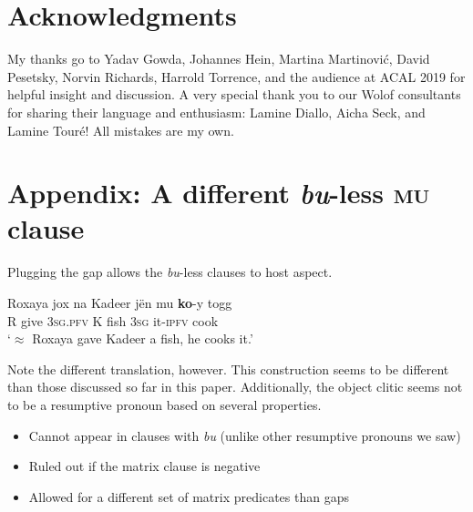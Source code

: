 \documentclass[output=paper]{langscibook}
\begin{document}
\section*{Acknowledgments}

My thanks go to Yadav Gowda, Johannes Hein, Martina Martinovi\'c, David Pesetsky, Norvin Richards, Harrold Torrence, and the audience at ACAL 2019 for helpful insight and discussion. A very special thank you to our Wolof consultants for sharing their language and enthusiasm: Lamine Diallo, Aicha Seck, and Lamine Tour\'e! All mistakes are my own.



\section*{Appendix: A different \emph{bu}-less \textsc{mu} clause}

Plugging the gap allows the \emph{bu}-less clauses to host aspect.

\begin{exe}
	\ex 
	\gll Roxaya jox na Kadeer j\"en mu \textbf{ko}-y togg \\
	R give \textsc{3sg.pfv} K fish \textsc{3sg} it\textsc{-ipfv} cook \\
	\trans `$\approx$ Roxaya gave Kadeer a fish, he cooks it.'
\end{exe}

Note the different translation, however. This construction seems to be different than those discussed so far in this paper. Additionally, the object clitic seems not to be a resumptive pronoun based on several properties.

\begin{itemize}
	\item Cannot appear in clauses with \emph{bu} (unlike other resumptive pronouns we saw)
	\item Ruled out if the matrix clause is negative
	\item Allowed for a different set of matrix predicates than gaps
\end{itemize}
\end{document}
